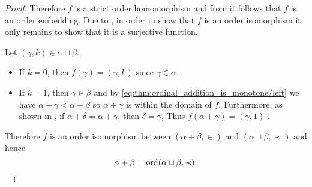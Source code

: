 \begin{proof}
  Therefore \( f \) is a strict order homomorphism and from  it follows that \( f \) is an order embedding. Due to , in order to show that \( f \) is an order isomorphism it only remains to show that it is a surjective function.

  Let \( (\gamma, k) \in \alpha \sqcup \beta \).
  \begin{itemize}
    \item If \( k = 0 \), then \( f(\gamma) = (\gamma, k) \) since \( \gamma \in \alpha \).
    \item If \( k = 1 \), then \( \gamma \in \beta \) and by \eqref{eq:thm:ordinal_addition_is_monotone/left} we have \( \alpha + \gamma < \alpha + \beta \) so \( \alpha + \gamma \) is within the domain of \( f \). Furthermore, as shown in , if \( \alpha + \delta = \alpha + \gamma \), then \( \delta = \gamma \), Thus \( f(\alpha + \gamma) = (\gamma, 1) \) .
  \end{itemize}

  Therefore \( f \) is an order isomorphism between \( (\alpha + \beta, \in) \) and \( (\alpha \sqcup \beta, \prec) \) and hence
  \begin{equation*}
    \alpha + \beta = \operatorname{ord}(\alpha \sqcup \beta, \prec).
  \end{equation*}
\end{proof}

